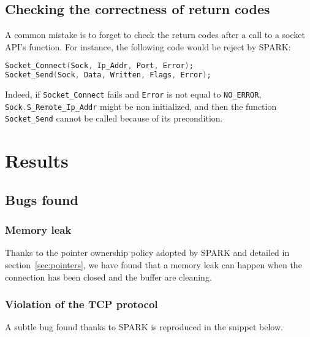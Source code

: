 \documentclass[conference]{IEEEtran}
\def\spark#1{\lstinline[language=Ada]{#1}}
\begin{document}
\subsection{Checking the correctness of return codes}

A common mistake is to forget to check the return codes after a call to a socket
API's function. For instance, the following code would be reject by SPARK:
\begin{lstlisting}[language=Ada,basicstyle=\small\ttfamily]
Socket_Connect(Sock, Ip_Addr, Port, Error);
Socket_Send(Sock, Data, Written, Flags, Error);
\end{lstlisting}
Indeed, if \spark{Socket_Connect} fails and \spark{Error} is not equal to
\spark{NO_ERROR}, \spark{Sock.S_Remote_Ip_Addr} might be non initialized, and
then the function \spark{Socket_Send} cannot be called because of its
precondition.

\section{Results}
\label{sec:results}

\subsection{Bugs found}

\subsubsection{Memory leak}

Thanks to the pointer ownership policy adopted by SPARK and detailed in
section~\ref{sec:pointers}, we have found that a memory leak can happen when
the connection has been closed and the buffer are cleaning.

\subsubsection{Violation of the TCP protocol}

A subtle bug found thanks to SPARK is
reproduced in the snippet below.
\end{document}
